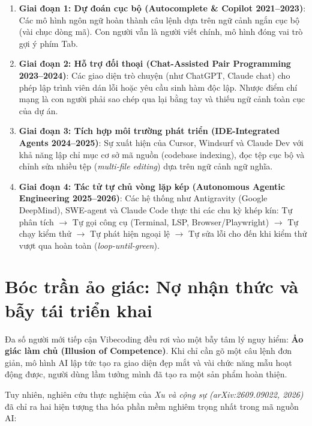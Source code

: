 \documentclass[a4paper,11pt]{article}
\begin{document}
\begin{enumerate}[label={\arabic*.}]
    \item \textbf{Giai đoạn 1: Dự đoán cục bộ (Autocomplete \& Copilot 2021--2023)}: Các mô hình ngôn ngữ hoàn thành câu lệnh dựa trên ngữ cảnh ngắn cục bộ (vài chục dòng mã). Con người vẫn là người viết chính, mô hình đóng vai trò gợi ý phím Tab.
    \item \textbf{Giai đoạn 2: Hỗ trợ đối thoại (Chat-Assisted Pair Programming 2023--2024)}: Các giao diện trò chuyện (như ChatGPT, Claude chat) cho phép lập trình viên dán lỗi hoặc yêu cầu sinh hàm độc lập. Nhược điểm chí mạng là con người phải sao chép qua lại bằng tay và thiếu ngữ cảnh toàn cục của dự án.
    \item \textbf{Giai đoạn 3: Tích hợp môi trường phát triển (IDE-Integrated Agents 2024--2025)}: Sự xuất hiện của Cursor, Windsurf và Claude Dev với khả năng lập chỉ mục cơ sở mã nguồn (codebase indexing), đọc tệp cục bộ và chỉnh sửa nhiều tệp (\textit{multi-file editing}) dựa trên ngữ cảnh ngữ nghĩa.
    \item \textbf{Giai đoạn 4: Tác tử tự chủ vòng lặp kép (Autonomous Agentic Engineering 2025--2026)}: Các hệ thống như Antigravity (Google DeepMind), SWE-agent và Claude Code thực thi các chu kỳ khép kín: Tự phân tích $\rightarrow$ Tự gọi công cụ (Terminal, LSP, Browser/Playwright) $\rightarrow$ Tự chạy kiểm thử $\rightarrow$ Tự phát hiện ngoại lệ $\rightarrow$ Tự sửa lỗi cho đến khi kiểm thử vượt qua hoàn toàn (\textit{loop-until-green}).
\end{enumerate}

\section{Bóc trần ảo giác: Nợ nhận thức và bẫy tái triển khai}

Đa số người mới tiếp cận Vibecoding đều rơi vào một bẫy tâm lý nguy hiểm: \textbf{Ảo giác làm chủ (Illusion of Competence)}. Khi chỉ cần gõ một câu lệnh đơn giản, mô hình AI lập tức tạo ra giao diện đẹp mắt và vài chức năng mẫu hoạt động được, người dùng lầm tưởng mình đã tạo ra một sản phẩm hoàn thiện.

Tuy nhiên, nghiên cứu thực nghiệm của \textit{Xu và cộng sự (arXiv:2609.09022, 2026)} đã chỉ ra hai hiện tượng tha hóa phần mềm nghiêm trọng nhất trong mã nguồn AI:
\end{document}
